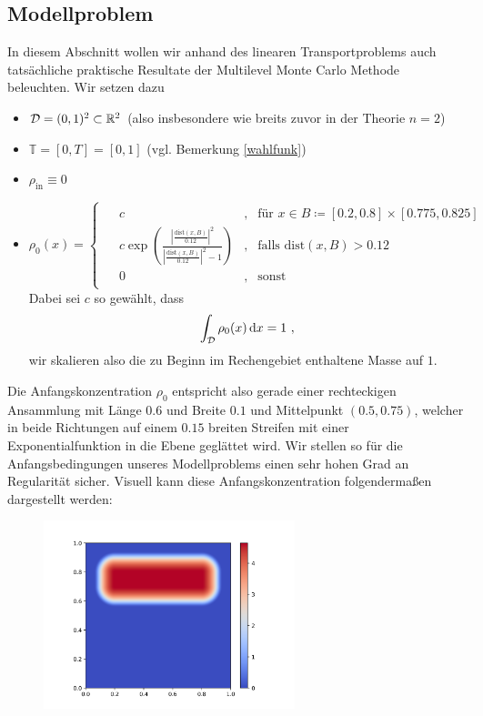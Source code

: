 
\subsection{Modellproblem}

In diesem Abschnitt wollen wir anhand des linearen Transportproblems auch tatsächliche praktische Resultate der Multilevel Monte Carlo Methode beleuchten.
Wir setzen dazu
\begin{itemize}
	\item $ \mathcal{D} = (0,1)^2 \subset \mathbb{R}^2 $ (also insbesondere wie breits zuvor in der Theorie $ n=2 $)
	\item $ \mathbb{T} = [0,T] = [0,1] $ (vgl. Bemerkung \ref{wahlfunk})
	\item $ \rho_{\text{in}} \equiv 0 $
	\item $ \rho_0(x) = 
	\begin{cases*}
		\begin{array}{llll}
			&c & , &\text{für }x \in B \coloneqq [0.2,0.8] \times [0.775 ,0.825]  \\
			&c\exp \left(\frac{ \left| \frac{\text{dist}(x,B)}{0.12} \right| ^2}{\left|\frac{\text{dist}(x,B)}{0.12}\right|^2-1}\right) &, &\text{falls } \text{dist}(x,B)>0.12 \\
			&0 &, & \text{sonst}
		\end{array}
	\end{cases*}$ \\
	Dabei sei $ c $ so gewählt, dass 
	\[
		\int_{\mathcal{D}} \rho_0(x) \, \mathrm{d} x = 1 \ ,
	\]
	wir skalieren also die zu Beginn im Rechengebiet enthaltene Masse auf $ 1 $.
\end{itemize} 
Die Anfangskonzentration $ \rho_0 $ entspricht also gerade einer rechteckigen Ansammlung mit Länge $ 0.6$ und Breite $ 0.1$ und Mittelpunkt $ (0.5,0.75) $, welcher in beide Richtungen auf einem $ 0.15$ breiten Streifen mit einer Exponentialfunktion in die Ebene geglättet wird. 
Wir stellen so für die Anfangsbedingungen unseres Modellproblems einen sehr hohen Grad an Regularität sicher. 
Visuell kann diese Anfangskonzentration folgendermaßen dargestellt werden:
\begin{figure}[H]
	\centering
	\includegraphics[width=0.65\textwidth]{plots/anfangsbedingung.png} 
\end{figure}
